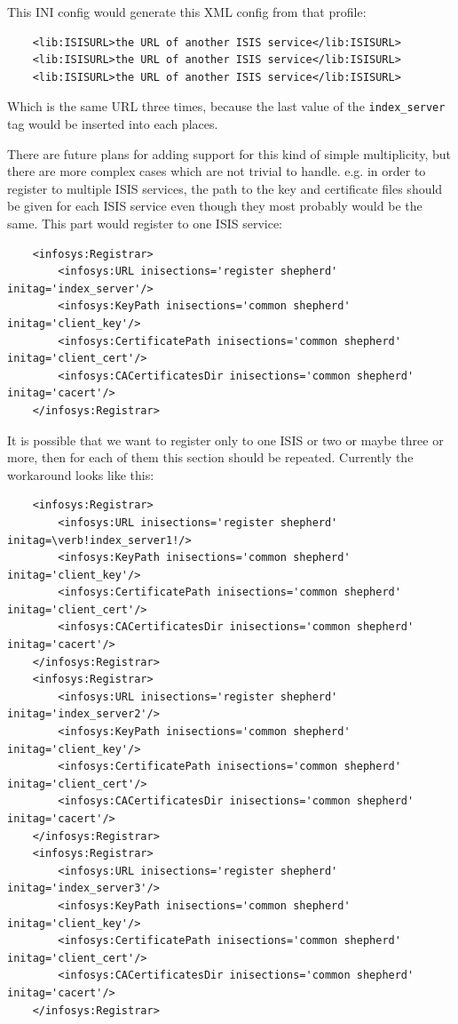 \documentclass{article}
\begin{document}
This INI config would generate this XML config from that profile:

\begin{verbatim}
	<lib:ISISURL>the URL of another ISIS service</lib:ISISURL>
	<lib:ISISURL>the URL of another ISIS service</lib:ISISURL>
	<lib:ISISURL>the URL of another ISIS service</lib:ISISURL>
\end{verbatim}


Which is the same URL three times, because the last value of the \verb!index_server! tag would be inserted into each places.

There are future plans for adding support for this kind of simple multiplicity, but there are more complex cases which are not trivial to handle. e.g. in order to register to multiple ISIS services, the path to the key and certificate files should be given for each ISIS service even though they most probably would be the same. This part would register to one ISIS service:

\begin{verbatim}
	<infosys:Registrar>
		<infosys:URL inisections='register shepherd' initag='index_server'/>
		<infosys:KeyPath inisections='common shepherd' initag='client_key'/>
		<infosys:CertificatePath inisections='common shepherd' initag='client_cert'/>
		<infosys:CACertificatesDir inisections='common shepherd' initag='cacert'/>
	</infosys:Registrar>
\end{verbatim}

It is possible that we want to register only to one ISIS or two or maybe three or more, then for each of them this section should be repeated. Currently the workaround looks like this:

\begin{verbatim}
	<infosys:Registrar>
		<infosys:URL inisections='register shepherd' initag=\verb!index_server1!/>
		<infosys:KeyPath inisections='common shepherd' initag='client_key'/>
		<infosys:CertificatePath inisections='common shepherd' initag='client_cert'/>
		<infosys:CACertificatesDir inisections='common shepherd' initag='cacert'/>
	</infosys:Registrar>
	<infosys:Registrar>
		<infosys:URL inisections='register shepherd' initag='index_server2'/>
		<infosys:KeyPath inisections='common shepherd' initag='client_key'/>
		<infosys:CertificatePath inisections='common shepherd' initag='client_cert'/>
		<infosys:CACertificatesDir inisections='common shepherd' initag='cacert'/>
	</infosys:Registrar>
	<infosys:Registrar>
		<infosys:URL inisections='register shepherd' initag='index_server3'/>
		<infosys:KeyPath inisections='common shepherd' initag='client_key'/>
		<infosys:CertificatePath inisections='common shepherd' initag='client_cert'/>
		<infosys:CACertificatesDir inisections='common shepherd' initag='cacert'/>
	</infosys:Registrar>
\end{verbatim}
\end{document}
